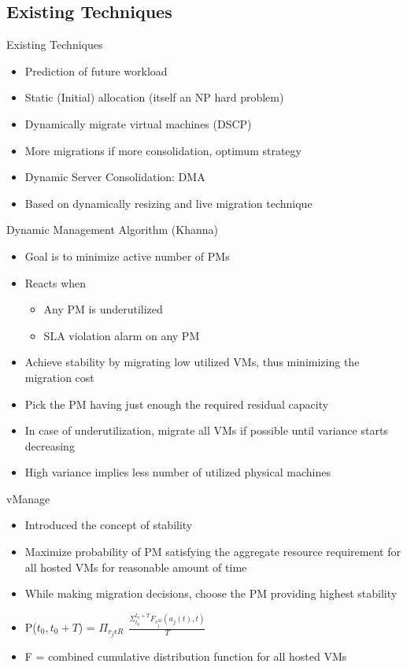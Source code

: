 \documentclass{beamer}
\begin{document}
\subsection{Existing Techniques}
\begin{frame}{Existing Techniques}
\begin{itemize}
\item Prediction of future workload
\item Static (Initial) allocation (itself an NP hard problem)
\item Dynamically migrate virtual machines (DSCP)
\item More migrations if more consolidation, optimum strategy
\item Dynamic Server Consolidation: DMA
\item Based on dynamically resizing and live migration technique
\end{itemize}
\end{frame}

\begin{frame}{Dynamic Management Algorithm (Khanna)}
\begin{itemize}
\item Goal is to minimize active number of PMs
\item Reacts when
\begin{itemize}
\item Any PM is underutilized
\item SLA violation alarm on any PM
\end{itemize}
\item Achieve stability by migrating low utilized VMs, thus minimizing the migration cost
\item Pick the PM having just enough the required residual capacity
\item In case of underutilization, migrate all VMs if possible until variance starts decreasing
\item High variance implies less number of utilized physical machines
\end{itemize}
\end{frame}

\begin{frame}{vManage}
\begin{itemize}
\item Introduced the concept of stability
\item Maximize probability of PM satisfying the aggregate resource requirement for all hosted VMs for reasonable amount of time
\item While making migration decisions, choose the PM providing highest stability
\item P($t_0, t_0+T$) = $\Pi _{r_j \epsilon R} \ \ \frac{\Sigma _{t_0} ^{t_0 + T} F_{v_j^M} (a_j(t), t)}{T}$
\item F = combined cumulative distribution function for all hosted VMs
\end{itemize}
\end{frame}
\end{document}

